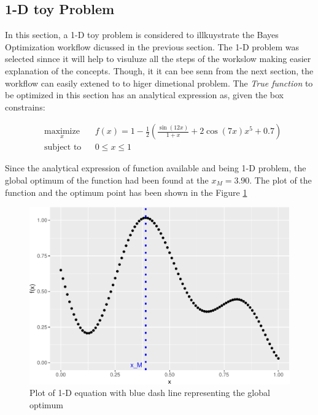 \documentclass[]{elsarticle} %
\begin{document}
\hypertarget{d-toy-problem}{%
\subsection{1-D toy Problem}\label{d-toy-problem}}

In this section, a 1-D toy problem is considered to illkuystrate the Bayes Optimization workflow dicussed in the previous section. The 1-D problem was selected sinnce it will help to visuluze all the steps of the workslow making easier explanation of the concepts. Though, it it can bee senn from the next section, the workflow can easily extened to to higer dimetional problem. The \emph{True function} to be optimized in this section has an analytical expression as, given the box constrains:

\begin{equation}
\begin{aligned}
& \underset{x}{\text{maximize}}
& & f(x) = 1-\frac{1}{2}(\frac{\sin (12x)}{1+x} + 2\cos(7x)x^5 + 0.7)  \\
& \text{subject to}
& & 0 \leq x \leq 1
\end{aligned}
\label{eq:1deq}
\end{equation}

Since the analytical expression of function available and being 1-D problem, the global optimum of the function had been found at the \(x_M = 3.90\). The plot of the function and the optimum point has been shown in the Figure \ref{fig:onedplot}

\begin{figure}

{\centering \includegraphics[width=0.9\linewidth]{0_Paper1_main_files/figure-latex/onedplot-1} 

}

\caption{Plot of 1-D equation with blue dash line representing the global optimum}\label{fig:onedplot}
\end{figure}
\end{document}
